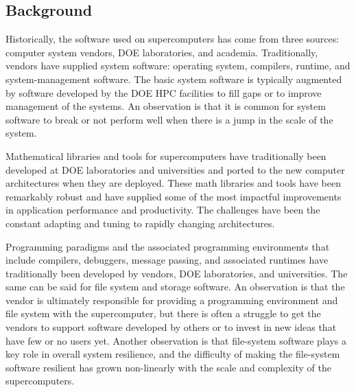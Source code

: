 \subsection{Background}
Historically, the software used on supercomputers has come from three sources: computer system vendors, DOE laboratories, and academia. Traditionally, vendors have supplied system software:  operating system, compilers, runtime, and system-management software. The basic system software is typically augmented by software developed by the DOE HPC facilities to fill gaps or to improve management of the systems. An observation is that it is common for system software to break or not perform well when there is a jump in the scale of the system.
 
Mathematical libraries and tools for supercomputers have traditionally been developed at DOE laboratories and universities and ported to the new computer architectures when they are deployed. These math libraries and tools have been remarkably robust and have supplied some of the most impactful improvements in application performance and productivity. The challenges have been the constant adapting and tuning to rapidly changing architectures.
 
Programming paradigms and the associated programming environments that include compilers, debuggers, message passing, and associated runtimes have traditionally been developed by vendors, DOE laboratories, and universities. The same can be said for file system and storage software. An observation is that the vendor is ultimately responsible for providing a programming environment and file system with the supercomputer, but there is often a struggle to get the vendors to support software developed by others or to invest in new ideas that have few or no users yet. Another observation is that file-system software plays a key role in overall system resilience, and the difficulty of making the file-system software resilient has grown non-linearly with the scale and complexity of the supercomputers.
 
